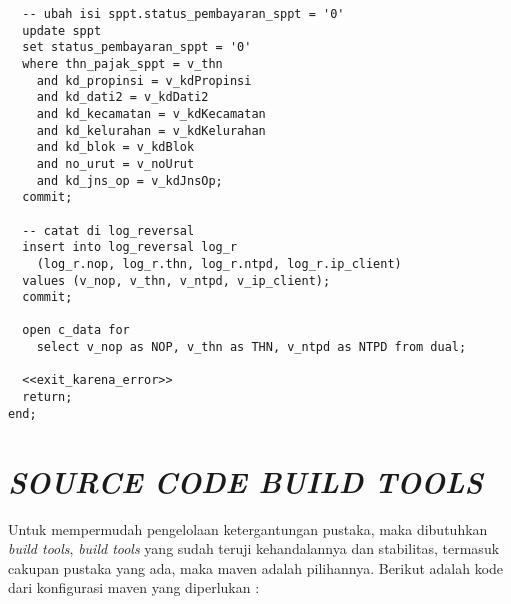 \documentclass[pdftex,12pt, oneside]{article}
\begin{document}
\begin{lstlisting}
  -- ubah isi sppt.status_pembayaran_sppt = '0'
  update sppt
  set status_pembayaran_sppt = '0'
  where thn_pajak_sppt = v_thn
    and kd_propinsi = v_kdPropinsi
    and kd_dati2 = v_kdDati2
    and kd_kecamatan = v_kdKecamatan
    and kd_kelurahan = v_kdKelurahan
    and kd_blok = v_kdBlok
    and no_urut = v_noUrut
    and kd_jns_op = v_kdJnsOp;
  commit;

  -- catat di log_reversal
  insert into log_reversal log_r
    (log_r.nop, log_r.thn, log_r.ntpd, log_r.ip_client)
  values (v_nop, v_thn, v_ntpd, v_ip_client);
  commit;

  open c_data for
    select v_nop as NOP, v_thn as THN, v_ntpd as NTPD from dual;

  <<exit_karena_error>>
  return;
end;
\end{lstlisting}

\section{\textit{SOURCE CODE BUILD TOOLS}}

Untuk mempermudah pengelolaan ketergantungan pustaka, maka dibutuhkan \textit{build tools}, \textit{build tools} yang sudah teruji kehandalannya dan stabilitas, termasuk cakupan pustaka yang ada, maka maven adalah pilihannya. Berikut adalah kode dari konfigurasi maven yang diperlukan :
\end{document}
